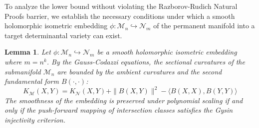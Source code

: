 \documentclass{article}
\newtheorem{lemma}{Lemma}
\begin{document}
To analyze the lower bound without violating the Razborov-Rudich Natural Proofs barrier, we establish the necessary conditions under which a smooth holomorphic isometric embedding $\phi: \mathcal{M}_n \hookrightarrow \mathcal{N}_m$ of the permanent manifold into a target determinantal variety can exist.

\begin{lemma}
Let $\phi: \mathcal{M}_n \hookrightarrow \mathcal{N}_m$ be a smooth holomorphic isometric embedding where $m = n^k$. By the Gauss-Codazzi equations, the sectional curvatures of the submanifold $\mathcal{M}_n$ are bounded by the ambient curvatures and the second fundamental form $B(\cdot, \cdot)$:
\begin{equation}
K_{\mathcal{M}}(X, Y) = K_{\mathcal{N}}(X, Y) + \|B(X, Y)\|^2 - \langle B(X, X), B(Y, Y) \rangle
\end{equation}
The smoothness of the embedding is preserved under polynomial scaling if and only if the push-forward mapping of intersection classes satisfies the Gysin injectivity criterion.
\end{lemma}
\end{document}
